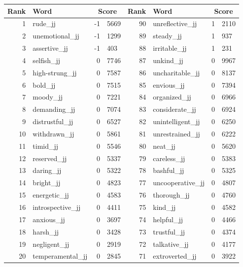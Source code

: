 \begin{table}[tbp]
    \begin{tabular}{| rlr@{.}l | rlr@{.}l |}
    \hline
    \textbf{Rank} & \textbf{Word} & \multicolumn{2}{c|}{\textbf{Score}} & \textbf{Rank} & \textbf{Word} & \multicolumn{2}{c|}{\textbf{Score}} \\
    \hline
    1 & rude\_jj & -1 & 5669    &    90 & unreflective\_jj & 1 & 2110 \\
    2 & unemotional\_jj & -1 & 1299    &    89 & steady\_jj & 1 & 937 \\
    3 & assertive\_jj & -1 & 403    &    88 & irritable\_jj & 1 & 231 \\
    4 & selfish\_jj & 0 & 7746    &    87 & unkind\_jj & 0 & 9967 \\
    5 & high-strung\_jj & 0 & 7587    &    86 & uncharitable\_jj & 0 & 8137 \\
    6 & bold\_jj & 0 & 7515    &    85 & envious\_jj & 0 & 7394 \\
    7 & moody\_jj & 0 & 7221    &    84 & organized\_jj & 0 & 6966 \\
    8 & demanding\_jj & 0 & 7074    &    83 & considerate\_jj & 0 & 6924 \\
    9 & distrustful\_jj & 0 & 6527    &    82 & unintelligent\_jj & 0 & 6250 \\
    10 & withdrawn\_jj & 0 & 5861    &    81 & unrestrained\_jj & 0 & 6222 \\
    11 & timid\_jj & 0 & 5546    &    80 & neat\_jj & 0 & 5620 \\
    12 & reserved\_jj & 0 & 5337    &    79 & careless\_jj & 0 & 5383 \\
    13 & daring\_jj & 0 & 5322    &    78 & bashful\_jj & 0 & 5325 \\
    14 & bright\_jj & 0 & 4823    &    77 & uncooperative\_jj & 0 & 4807 \\
    15 & energetic\_jj & 0 & 4583    &    76 & thorough\_jj & 0 & 4760 \\
    16 & introspective\_jj & 0 & 4411    &    75 & kind\_jj & 0 & 4582 \\
    17 & anxious\_jj & 0 & 3697    &    74 & helpful\_jj & 0 & 4466 \\
    18 & harsh\_jj & 0 & 3428    &    73 & trustful\_jj & 0 & 4374 \\
    19 & negligent\_jj & 0 & 2919    &    72 & talkative\_jj & 0 & 4177 \\
    20 & temperamental\_jj & 0 & 2845    &    71 & extroverted\_jj & 0 & 3922 \\

\end{tabular}
\end{table}
